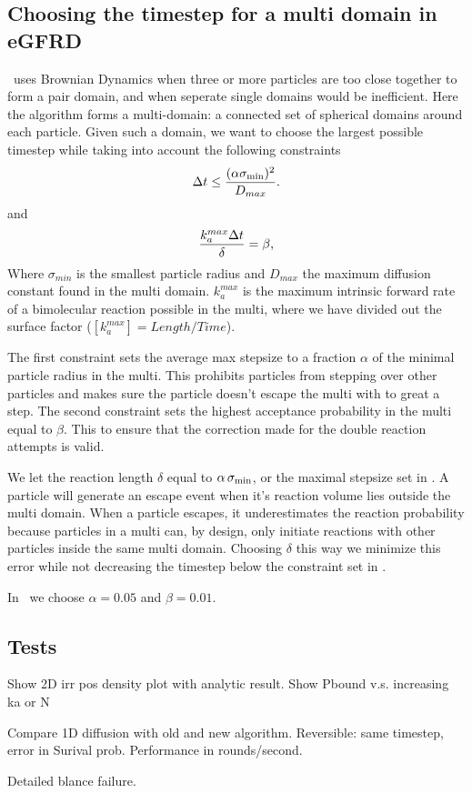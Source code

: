\subsection{Choosing the timestep for a multi domain in eGFRD}

\GFRD\, uses Brownian Dynamics when three or more particles are too close together to form a pair domain, and when seperate single domains would be inefficient. Here the algorithm forms a multi-domain: a connected set of spherical domains around each particle. Given such a domain, we want to choose the largest possible timestep while taking into account the following constraints
\begin{equation}
 \Delta t \leq \frac{(\alpha \sigma_{\rm min})^2 }{D_{max}}.
 \elabel{BDcntrI}
\end{equation}
and
\begin{equation}
 \frac{k_{a}^{max} \Delta t}{\delta} = \beta,
 \elabel{BDcntrII}
\end{equation}
Where $\sigma_{min}$ is the smallest particle radius and $D_{max}$ the maximum diffusion constant found in the multi domain. $k_{a}^{max}$ is the maximum intrinsic forward rate of a bimolecular reaction possible in the multi, where we have divided out the surface factor ($[k_{a}^{max}] = Length/Time $).

The first constraint sets the average max stepsize to a fraction $\alpha$ of the minimal particle radius in the multi. This prohibits particles from stepping over other particles and makes sure the particle doesn't escape the multi with to great a step. The second constraint sets the highest acceptance probability in the multi equal to $\beta$. This to ensure that the correction made for the double reaction attempts is valid. 

We let the reaction length $\delta$ equal to $\alpha \, \sigma_{\rm min}$, or the maximal stepsize set in . A particle will generate an escape event when it's reaction volume lies outside the multi domain. When a particle escapes, it underestimates the reaction probability because particles in a multi can, by design, only initiate reactions with other particles inside the same multi domain. Choosing $\delta$ this way we minimize this error while not decreasing the timestep below the constraint set in .

In \GFRD\, we choose $\alpha = 0.05$ and $\beta = 0.01$.

\subsection{Tests}
Show 2D irr pos density plot with analytic result.
Show Pbound v.s. increasing ka or N

Compare 1D diffusion with old and new algorithm. Reversible: same timestep, error in Surival prob. Performance in rounds/second.

Detailed blance failure.